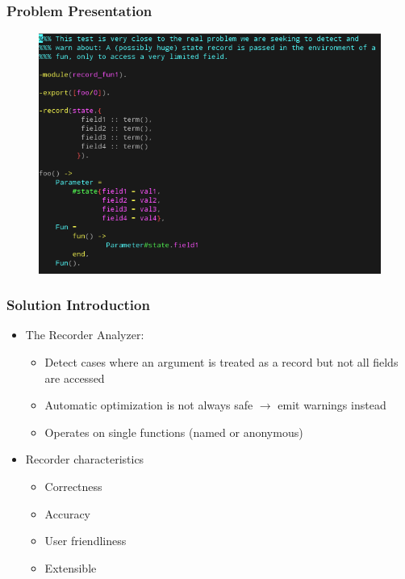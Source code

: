 \begin{frame}
  \frametitle{Problem Presentation}
  
  \begin{figure}
    \centering
    \includegraphics[scale=0.45]{../figures/problem_introduction}
  \end{figure}
  
\end{frame}

\begin{frame}
  \frametitle{Solution Introduction}
  
  \begin{itemize}
  \item The Recorder Analyzer:
    \begin{itemize}
    \item Detect cases where an argument is treated as a record but not all
      fields are accessed
    \item Automatic optimization is not always safe $\to$ emit warnings instead
    \item Operates on single functions (named or anonymous)
    \end{itemize}
  \item Recorder characteristics
    \begin{itemize}
    \item Correctness
    \item Accuracy
    \item User friendliness
    \item Extensible
    \end{itemize}
  \end{itemize}
  
\end{frame}
